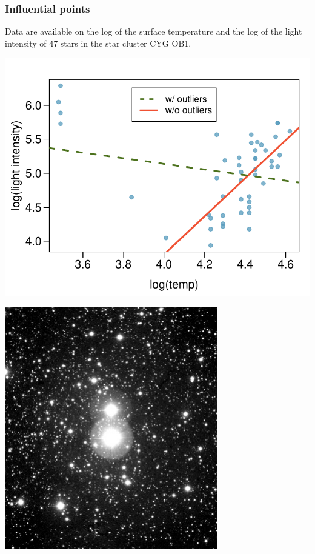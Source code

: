 \begin{frame}
\frametitle{Influential points}

Data are available on the log of the surface temperature and the log of the light intensity of 47 stars in the star cluster CYG OB1.

{
\begin{center}
\includegraphics[width=\textwidth]{8-3_outliers/figures/stars/star}
\end{center}
}
{
\begin{center}
\includegraphics[width=\textwidth]{8-3_outliers/figures/stars/cyg}
\end{center}
}

\end{frame}

